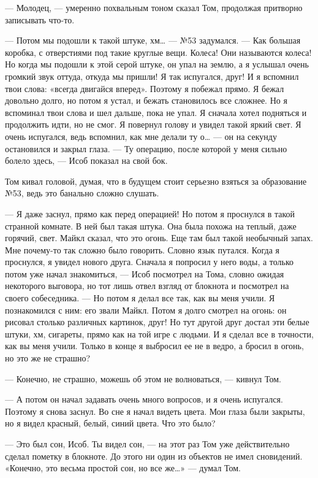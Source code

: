 — Молодец, — умеренно похвальным тоном сказал Том, продолжая притворно записывать что-то.

— Потом мы подошли к такой штуке, хм… — №53 задумался. — Как большая коробка, с отверстиями под такие круглые вещи. Колеса! Они называются колеса! Но когда мы подошли к этой серой штуке, он упал на землю, а я услышал очень громкий звук оттуда, откуда мы пришли! Я так испугался, друг! И я вспомнил твои слова: «всегда двигайся вперед». Поэтому я побежал прямо. Я бежал довольно долго, но потом я устал, и бежать становилось все сложнее. Но я вспоминал твои слова и шел дальше, пока не упал. Я сначала хотел подняться и продолжить идти, но не смог. Я повернул голову и увидел такой яркий свет. Я очень испугался, ведь вспомнил, как мне делали ту о… — он на секунду остановился и закрыл глаза. — Ту операцию, после которой у меня сильно болело здесь, — Исоб показал на свой бок.

Том кивал головой, думая, что в будущем стоит серьезно взяться за образование №53, ведь это банально сложно слушать.

— Я даже заснул, прямо как перед операцией! Но потом я проснулся в такой странной комнате. В ней был такая штука. Она была похожа на теплый, даже горячий, свет. Майкл сказал, что это огонь. Еще там был такой необычный запах. Мне почему-то так сложно было говорить. Словно язык путался. Когда я проснулся, я увидел нового друга. Сначала я попросил у него воды, а только потом уже начал знакомиться, — Исоб посмотрел на Тома, словно ожидая некоторого выговора, но тот лишь отвел взгляд от блокнота и посмотрел на своего собеседника. — Но потом я делал все так, как вы меня учили. Я познакомился с ним: его звали Майкл. Потом я долго смотрел на огонь: он рисовал столько различных картинок, друг! Но тут другой друг достал эти белые штуки, хм, сигареты, прямо как на той игре с людьми. И я сделал все в точности, как вы меня учили. Только в конце я выбросил ее не в ведро, а бросил в огонь, но это же не страшно?

— Конечно, не страшно, можешь об этом не волноваться, — кивнул Том.

— А потом он начал задавать очень много вопросов, и я очень испугался. Поэтому я снова заснул. Во сне я начал видеть цвета. Мои глаза были закрыты, но я видел красный, белый, синий цвета. Что это было?

— Это был сон, Исоб. Ты видел сон, — на этот раз Том уже действительно сделал пометку в блокноте. До этого ни один из объектов не имел сновидений. «Конечно, это весьма простой сон, но все же…» — думал Том.

